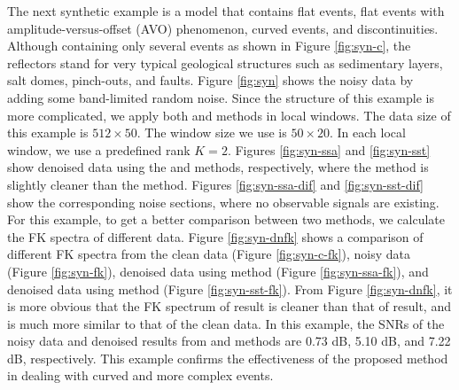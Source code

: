 The next synthetic example is a model that contains flat events, flat events with amplitude-versus-offset (AVO) phenomenon, curved events, and discontinuities. Although containing only several events as shown in Figure \ref{fig:syn-c}, the reflectors stand for very typical geological structures such as sedimentary layers, salt domes, pinch-outs, and faults. Figure \ref{fig:syn} shows the noisy data by adding some band-limited random noise. Since the structure of this example is more complicated, we apply both  and  methods in local windows. The data size of this example is $512\times 50$. The window size we use is $50\times20$. In each local window, we use a predefined rank $K=2$. Figures \ref{fig:syn-ssa} and \ref{fig:syn-sst} show denoised data using the  and  methods, respectively, where the  method is slightly cleaner than the  method. Figures \ref{fig:syn-ssa-dif} and \ref{fig:syn-sst-dif}  show the corresponding noise sections, where no observable signals are existing. For this example, to get a better comparison between two methods, we calculate the FK spectra of different data. Figure \ref{fig:syn-dnfk} shows a comparison of different FK spectra from the clean data (Figure \ref{fig:syn-c-fk}), noisy data (Figure \ref{fig:syn-fk}), denoised data using  method (Figure \ref{fig:syn-ssa-fk}), and denoised data using  method (Figure \ref{fig:syn-sst-fk}). From Figure \ref{fig:syn-dnfk}, it is more obvious that the FK spectrum of  result is cleaner than that of  result, and is much more similar to that of the clean data. In this example, the SNRs of the noisy data and denoised results from  and  methods are 0.73 dB, 5.10 dB, and 7.22 dB, respectively. This example confirms the effectiveness of the proposed method in dealing with curved and more complex events.

